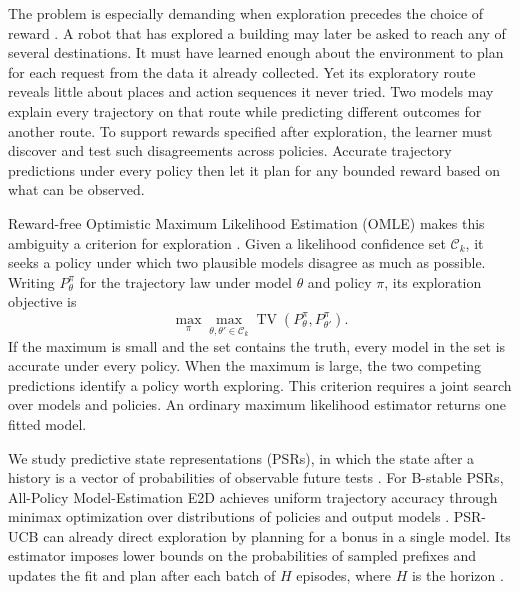 \documentclass[sigconf,nonacm]{acmart}
\newcommand{\TV}{\operatorname{TV}}
\begin{document}
The problem is especially demanding when exploration precedes the choice of reward \cite{jin2020rewardfree}. A robot that has explored a building may later be asked to reach any of several destinations. It must have learned enough about the environment to plan for each request from the data it already collected. Yet its exploratory route reveals little about places and action sequences it never tried. Two models may explain every trajectory on that route while predicting different outcomes for another route. To support rewards specified after exploration, the learner must discover and test such disagreements across policies. Accurate trajectory predictions under every policy then let it plan for any bounded reward based on what can be observed.

Reward-free Optimistic Maximum Likelihood Estimation (OMLE) makes this ambiguity a criterion for exploration \cite[Algorithm~2]{omle}. Given a likelihood confidence set $\mathcal C_k$, it seeks a policy under which two plausible models disagree as much as possible. Writing $P_\theta^\pi$ for the trajectory law under model $\theta$ and policy $\pi$, its exploration objective is
\[
 \max_\pi\max_{\theta,\theta'\in\mathcal C_k}
       \TV(P_\theta^\pi,P_{\theta'}^\pi).
\]
If the maximum is small and the set contains the truth, every model in the set is accurate under every policy. When the maximum is large, the two competing predictions identify a policy worth exploring. This criterion requires a joint search over models and policies. An ordinary maximum likelihood estimator returns one fitted model.

We study predictive state representations (PSRs), in which the state after a history is a vector of probabilities of observable future tests \cite{littman,singh}. For B-stable PSRs, All-Policy Model-Estimation E2D achieves uniform trajectory accuracy through minimax optimization over distributions of policies and output models \cite[Theorem~H.4]{bstable}. PSR-UCB can already direct exploration by planning for a bonus in a single model. Its estimator imposes lower bounds on the probabilities of sampled prefixes and updates the fit and plan after each batch of $H$ episodes, where $H$ is the horizon \cite{psrucb}.
\end{document}

